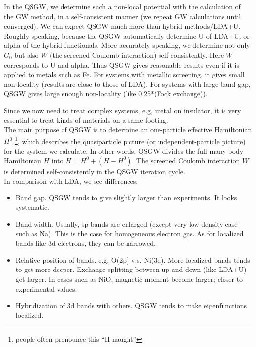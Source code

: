 In the QSGW, we determine such a non-local potential with the calculation of the 
GW method, in a self-consistent manner (we repeat GW calculations
until converged). We can expect QSGW much more than hybrid methods/LDA+U.
Roughly speaking, because the QSGW automatically determine 
U of LDA+U, or alpha of the hybrid functionals. More accurately speaking,
we determine not only $G_0$ but also $W$  (the screened Coulomb
interaction) self-consistently. Here $W$ corresponds to U and alpha.
Thus QSGW gives reasonable results even if it is applied to metals such
as Fe. For systems with metallic screening, it gives small non-locality
(results are close to those of LDA). For systems with large band gap,
QSGW gives large enough non-locality (like 0.25*(Fock exchange)).

Since we now need to treat complex systems, e.g, metal on
insulator, it is very essential to treat kinds of materials
on a same footing.\\

The main purpose of QSGW is to determine an one-particle effective
Hamiltonian $H^0$  \footnote{people often pronounce this “H-naught”},
which describes the quasiparticle picture (or independent-particle
picture) for the system we calculate.
In other words, QSGW divides the full many-body Hamiltonian $H$ into
$H=H^0+(H-H^0)$.
The screened Coulomb interaction $W$ is determined self-consistently in
the QSGW iteration cycle.\\

\noindent In comparison with LDA, we see differences;
\begin{itemize}
\item
Band gap. QSGW tends to give slightly larger than experiments. It looks systematic.
\item
Band width. Usually, sp bands are enlarged 
     (except very low density case such as Na).
     This is the case for homogeneous electron gas.
     As for localized bands like 3d electrons, they can be narrowed.
\item
Relative position of bands. e.g. O(2p) v.s. Ni(3d).
More localized bands tends to get more deeper.
Exchange splitting between up and down (like LDA+U) get larger.
In cases such as NiO, magnetic moment become larger; closer to
experimental values.
\item
Hybridization of 3d bands with others. 
QSGW tends to make eigenfunctions localized.
\end{itemize}


